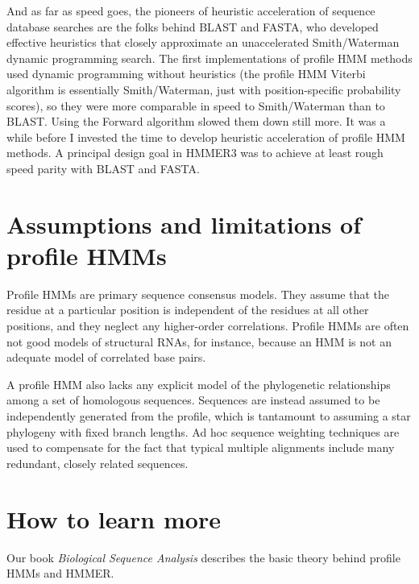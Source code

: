 And as far as speed goes, the pioneers of heuristic acceleration of
sequence database searches are the folks behind BLAST and FASTA, who
developed effective heuristics that closely approximate an
unaccelerated Smith/Waterman dynamic programming search.  The first
implementations of profile HMM methods used dynamic programming
without heuristics (the profile HMM Viterbi algorithm is essentially
Smith/Waterman, just with position-specific probability scores), so
they were more comparable in speed to Smith/Waterman than to BLAST.
Using the Forward algorithm slowed them down still more. It was a
while before I invested the time to develop heuristic acceleration of
profile HMM methods. A principal design goal in HMMER3 was to achieve
at least rough speed parity with BLAST and FASTA.


\section{Assumptions and limitations of profile HMMs}

Profile HMMs are primary sequence consensus models.  They assume that
the residue at a particular position is independent of the residues at
all other positions, and they neglect any higher-order correlations.
Profile HMMs are often not good models of structural RNAs, for
instance, because an HMM is not an adequate model of correlated base
pairs.

A profile HMM also lacks any explicit model of the phylogenetic
relationships among a set of homologous sequences. Sequences are
instead assumed to be independently generated from the profile, which
is tantamount to assuming a star phylogeny with fixed branch
lengths. Ad hoc sequence weighting techniques are used to compensate
for the fact that typical multiple alignments include many redundant,
closely related sequences.






\section{How to learn more}

Our book \emph{Biological Sequence Analysis}\cite{Durbin98} describes the basic
theory behind profile HMMs and HMMER.

